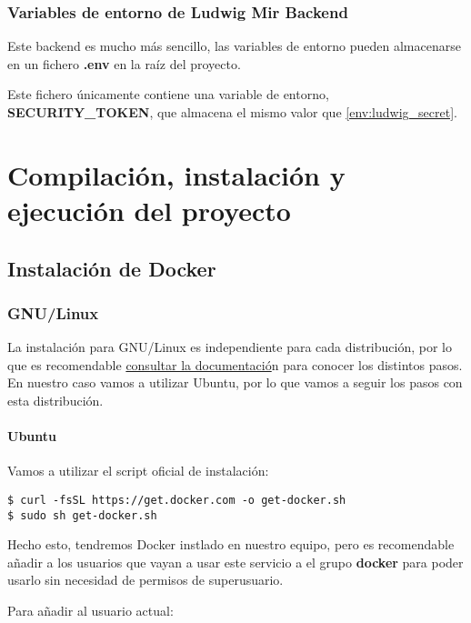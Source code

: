 \subsubsection{Variables de entorno de Ludwig Mir Backend}
Este backend es mucho más sencillo, las variables de entorno pueden almacenarse en un fichero \textbf{.env} en la raíz del proyecto. 

Este fichero únicamente contiene una variable de entorno, \textbf{SECURITY\_TOKEN}, que almacena el mismo valor que \ref{env:ludwig_secret}.

\section{Compilación, instalación y ejecución del proyecto}

\subsection{Instalación de Docker}

\hypertarget{gnulinux}{%
\subsubsection{GNU/Linux}\label{gnulinux}}

La instalación para GNU/Linux es independiente para cada distribución,
por lo que es recomendable
\href{https://docs.docker.com/engine/install/ubuntu/}{consultar la
documentació}n para conocer los distintos pasos. En nuestro caso vamos a
utilizar Ubuntu, por lo que vamos a seguir los pasos con esta
distribución.

\hypertarget{ubuntu}{%
\paragraph{Ubuntu}\label{ubuntu}}

Vamos a utilizar el script oficial de instalación:

\begin{verbatim}
$ curl -fsSL https://get.docker.com -o get-docker.sh
$ sudo sh get-docker.sh
\end{verbatim}

Hecho esto, tendremos Docker instlado en nuestro equipo, pero es
recomendable añadir a los usuarios que vayan a usar este servicio a el
grupo \textbf{docker} para poder usarlo sin necesidad de permisos de
superusuario.

Para añadir al usuario actual:

